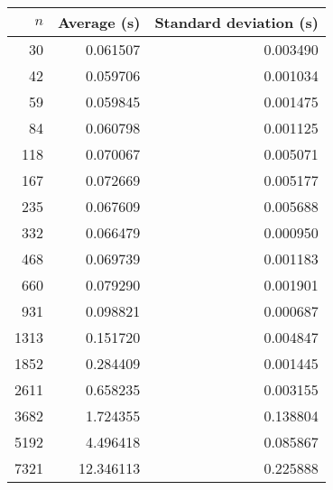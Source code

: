 \begin{tabular}{rrr}
$n$ & Average (s) & Standard deviation (s)\\\hline
30 & 0.061507 & 0.003490\\
42 & 0.059706 & 0.001034\\
59 & 0.059845 & 0.001475\\
84 & 0.060798 & 0.001125\\
118 & 0.070067 & 0.005071\\
167 & 0.072669 & 0.005177\\
235 & 0.067609 & 0.005688\\
332 & 0.066479 & 0.000950\\
468 & 0.069739 & 0.001183\\
660 & 0.079290 & 0.001901\\
931 & 0.098821 & 0.000687\\
1313 & 0.151720 & 0.004847\\
1852 & 0.284409 & 0.001445\\
2611 & 0.658235 & 0.003155\\
3682 & 1.724355 & 0.138804\\
5192 & 4.496418 & 0.085867\\
7321 & 12.346113 & 0.225888\\
\end{tabular}
